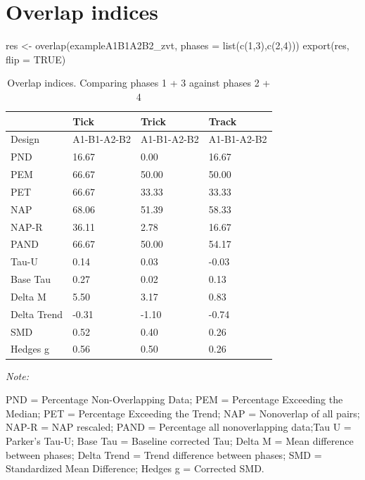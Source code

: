 \documentclass[
]{book}
\newenvironment{Shaded}{\begin{snugshade}}{\end{snugshade}}
\newcommand{\AttributeTok}[1]{\textcolor[rgb]{0.77,0.63,0.00}{#1}}
\newcommand{\ConstantTok}[1]{\textcolor[rgb]{0.00,0.00,0.00}{#1}}
\newcommand{\DecValTok}[1]{\textcolor[rgb]{0.00,0.00,0.81}{#1}}
\newcommand{\FunctionTok}[1]{\textcolor[rgb]{0.00,0.00,0.00}{#1}}
\newcommand{\NormalTok}[1]{#1}
\newcommand{\OtherTok}[1]{\textcolor[rgb]{0.56,0.35,0.01}{#1}}
\begin{document}
\hypertarget{overlap-indices}{%
\section{Overlap indices}\label{overlap-indices}}

\begin{Shaded}
\begin{Highlighting}[]
\NormalTok{res }\OtherTok{\textless{}{-}} \FunctionTok{overlap}\NormalTok{(exampleA1B1A2B2\_zvt, }\AttributeTok{phases =} \FunctionTok{list}\NormalTok{(}\FunctionTok{c}\NormalTok{(}\DecValTok{1}\NormalTok{,}\DecValTok{3}\NormalTok{),}\FunctionTok{c}\NormalTok{(}\DecValTok{2}\NormalTok{,}\DecValTok{4}\NormalTok{)))}
\FunctionTok{export}\NormalTok{(res, }\AttributeTok{flip =} \ConstantTok{TRUE}\NormalTok{)}
\end{Highlighting}
\end{Shaded}

\begin{table}[!h]

\caption{\label{tab:unnamed-chunk-76}Overlap indices. Comparing phases 1 + 3 against phases 2 + 4}
\begin{threeparttable}
\begin{tabular}[t]{llll}
\toprule
  & Tick & Trick & Track\\
\midrule
Design & A1-B1-A2-B2 & A1-B1-A2-B2 & A1-B1-A2-B2\\
PND & 16.67 & 0.00 & 16.67\\
PEM & 66.67 & 50.00 & 50.00\\
PET & 66.67 & 33.33 & 33.33\\
NAP & 68.06 & 51.39 & 58.33\\
NAP-R & 36.11 & 2.78 & 16.67\\
PAND & 66.67 & 50.00 & 54.17\\
Tau-U & 0.14 & 0.03 & -0.03\\
Base Tau & 0.27 & 0.02 & 0.13\\
Delta M & 5.50 & 3.17 & 0.83\\
Delta Trend & -0.31 & -1.10 & -0.74\\
SMD & 0.52 & 0.40 & 0.26\\
Hedges g & 0.56 & 0.50 & 0.26\\
\bottomrule
\end{tabular}
\begin{tablenotes}
\item \textit{Note: } 
\item PND = Percentage Non-Overlapping Data; PEM = Percentage Exceeding the Median; PET = Percentage Exceeding the Trend; NAP = Nonoverlap of all pairs; NAP-R = NAP rescaled; PAND = Percentage all nonoverlapping data;Tau U = Parker's Tau-U; Base Tau = Baseline corrected Tau; Delta M = Mean difference between phases; Delta Trend = Trend difference between phases; SMD = Standardized Mean Difference; Hedges g = Corrected SMD.
\end{tablenotes}
\end{threeparttable}
\end{table}
\end{document}
